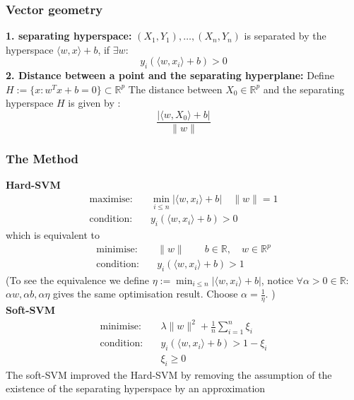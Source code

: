 \documentclass[a4paper,12pt, oneside, fleqn]{book}
\theoremstyle{definition}
\theoremstyle{remark}
\begin{document}
\subsubsection*{Vector geometry}
\textbf{1. separating hyperspace:} $(X_1, Y_1), \dots, (X_n, Y_n)$ is separated by the hyperspace $\langle w, x \rangle + b$, if $\exists w$:
\begin{equation*}
	y_i(\langle w, x_i \rangle + b) > 0
\end{equation*}
\textbf{2. Distance between a point and the separating hyperplane:} Define $H:= \{ x: w^T x + b = 0\} \subset \mathbb{R}^p $ The distance between $X_0 \in \mathbb{R}^p  $ and the separating hyperspace $H$ is given by :
\begin{equation*}
	\frac{| \langle w, X_0 \rangle + b |}{\| w \|} 
\end{equation*}


\subsubsection*{The Method}
\textbf{Hard-SVM}
\begin{equation}
\begin{aligned}
	\text{maximise:}& \quad \min_{i \leq n} | \langle w, x_i \rangle + b| \quad \|w \| = 1 \\
	\text{condition:}& \quad y_i(\langle w, x_i \rangle + b) > 0
\end{aligned}
\end{equation}
which is equivalent to
\begin{equation}
	\begin{aligned}
	\text{minimise:}& \quad \|w\| \qquad b \in \mathbb{R},\quad w \in \mathbb{R}^p \\
	\text{condition:}& \quad y_i(\langle w, x_i \rangle + b) > 1	
	\end{aligned}
\end{equation}
(To see the equivalence we define $\eta := \min_{i \leq n} | \langle w, x_i \rangle + b|$, notice $\forall \alpha > 0 \in \mathbb{R}:$ $\alpha w, \alpha b, \alpha \eta$ gives the same optimisation result. Choose $\alpha = \frac{1}{\eta}$. ) \\
\newline
\textbf{Soft-SVM}
\begin{equation}
	\begin{aligned}
	\text{minimise:}& \quad \lambda \|w\|^2 + \frac{1}{n} \sum_{i = 1}^n \xi_i \\
	\text{condition:}& \quad y_i(\langle w, x_i \rangle + b) > 1 - \xi_i\\
					&\quad \xi_i \geq 0	
	\end{aligned}
\end{equation}
The soft-SVM improved the Hard-SVM by removing the assumption of the existence of the separating hyperspace by an approximation
\end{document}
